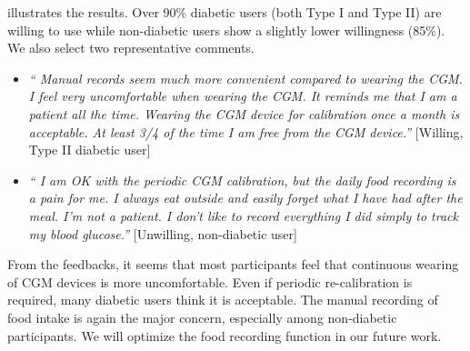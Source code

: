 { illustrates the results.
Over 90\% diabetic users (both Type I and Type II) are willing to use \sysname while non-diabetic users show a slightly lower willingness (85\%).
We also select two representative comments.
\begin{itemize}
  \item
  \textit{``
  Manual records seem much more convenient compared to wearing the CGM.
  I feel very uncomfortable when wearing the CGM.
  It reminds me that I am a patient all the time.
  Wearing the CGM device for calibration once a month is acceptable.
  At least 3/4 of the time I am free from the CGM device.''}
  [Willing, Type II diabetic user]
  \item
  \textit{``
  I am OK with the periodic CGM calibration, but the daily food recording is a pain for me.
  I always eat outside and easily forget what I have had after the meal.
  I'm not a patient.
  I don't like to record everything I did simply to track my blood glucose.''}
  [Unwilling, non-diabetic user]
\end{itemize}
From the feedbacks, it seems that most participants feel that continuous wearing of CGM devices is more uncomfortable.
Even if periodic re-calibration is required, many diabetic users think it is acceptable.
The manual recording of food intake is again the major concern, especially among non-diabetic participants. We will optimize the food recording function in our future work.




}
